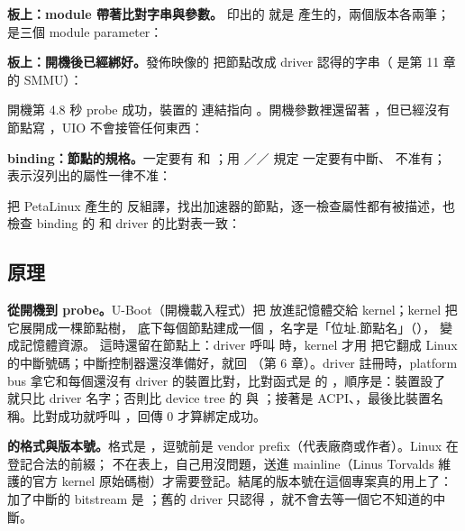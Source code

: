 \textbf{板上：module 帶著比對字串與參數。} 印出的  就是  產生的，兩個版本各兩筆； 是三個 module parameter：


\textbf{板上：開機後已經綁好。}發佈映像的  把節點改成 driver 認得的字串（ 是第 11 章的 SMMU）：


開機第 4.8 秒 probe 成功，裝置的  連結指向 。開機參數裡還留著 ，但已經沒有節點寫 ，UIO 不會接管任何東西：


\textbf{binding：節點的規格。}一定要有  和 ；用 ／／ 規定  一定要有中斷、 不准有； 表示沒列出的屬性一律不准：


 把 PetaLinux 產生的  反組譯，找出加速器的節點，逐一檢查屬性都有被描述，也檢查 binding 的  和 driver 的比對表一致：


\subsection{原理}

\textbf{從開機到 probe。}U-Boot（開機載入程式）把  放進記憶體交給 kernel；kernel 把它展開成一棵節點樹， 底下每個節點建成一個 ，名字是「位址.節點名」（）， 變成記憶體資源。 這時還留在節點上：driver 呼叫  時，kernel 才用  把它翻成 Linux 的中斷號碼；中斷控制器還沒準備好，就回 （第 6 章）。driver 註冊時，platform bus 拿它和每個還沒有 driver 的裝置比對，比對函式是  的 ，順序是：裝置設了  就只比 driver 名字；否則比 device tree 的  與 ；接著是 ACPI、，最後比裝置名稱。比對成功就呼叫 ，回傳 0 才算綁定成功。

\textbf{ 的格式與版本號。}格式是 ，逗號前是 vendor prefix（代表廠商或作者）。Linux 在  登記合法的前綴； 不在表上，自己用沒問題，送進 mainline（Linus Torvalds 維護的官方 kernel 原始碼樹）才需要登記。結尾的版本號在這個專案真的用上了：加了中斷的 bitstream 是 ；舊的 driver 只認得 ，就不會去等一個它不知道的中斷。


